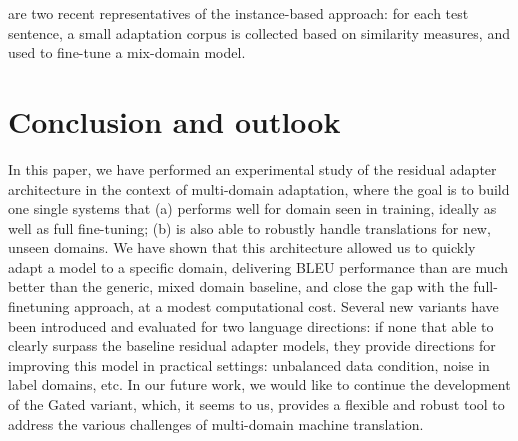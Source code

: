 \documentclass[11pt,a4paper]{article}
\newcommand{\fyFuture}[1]{\done[FY]\Todo[FY:]{\textcolor{red}{#1}}}
\newcommand{\mpTodo}[1]{\Todo[MP:]{\textcolor{green}{#1}}}
\newcommand{\mpDone}[1]{\done[MP]\Todo[MP:]{\textcolor{green}{#1}}}
\begin{document}
\citet{Farajian17multidomain,li-etal-2018-one} are two recent representatives of the instance-based approach: for each test sentence, a small adaptation corpus is collected based on similarity measures, and used to fine-tune a mix-domain model.

\section{Conclusion and outlook \label{sec:discussion}}
\mpDone{discussion}
In this paper, we have performed an experimental study of the residual adapter architecture in the context of multi-domain adaptation, where the goal is to build one single systems that (a) performs well for domain seen in training, ideally as well as full fine-tuning; (b) is also able to robustly handle translations for new, unseen domains. We have shown that this architecture allowed us to quickly adapt a model to a specific domain, delivering BLEU performance than are much better than the generic, mixed domain baseline, and close the gap with the full-finetuning approach, at a modest computational cost. Several new variants have been introduced and evaluated for two language directions: if none that able to clearly surpass the baseline residual adapter models, they provide directions for improving this model in practical settings: unbalanced data condition, noise in label domains, etc. In our future work, we would like to continue the development of the Gated variant, which, it seems to us, provides a flexible and robust tool to address the various challenges of multi-domain machine translation. 


\fyFuture{Thank you Jean Zay}



\end{document}
